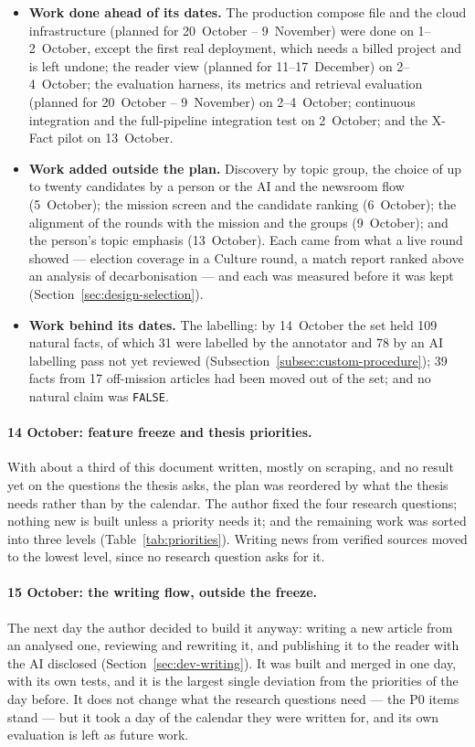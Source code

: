\begin{itemize}
    \item \textbf{Work done ahead of its dates.} The production compose
    file and the cloud infrastructure (planned for 20~October --
    9~November) were done on 1--2~October, except the first real
    deployment, which needs a billed project and is left undone; the
    reader view (planned for 11--17~December) on 2--4~October; the
    evaluation harness, its metrics and retrieval evaluation (planned
    for 20~October -- 9~November) on 2--4~October; continuous
    integration and the full-pipeline integration test on 2~October;
    and the X-Fact pilot on 13~October.
    \item \textbf{Work added outside the plan.} Discovery by topic
    group, the choice of up to twenty candidates by a person or the AI
    and the newsroom flow (5~October); the mission screen and the
    candidate ranking (6~October); the alignment of the rounds with the
    mission and the groups (9~October); and the person's topic emphasis
    (13~October). Each came from what a live round showed --- election
    coverage in a Culture round, a match report ranked above an
    analysis of decarbonisation --- and each was measured before it was
    kept (Section~\ref{sec:design-selection}).
    \item \textbf{Work behind its dates.} The labelling: by
    14~October the set held 109 natural facts, of which 31 were
    labelled by the annotator and 78 by an AI labelling pass not yet
    reviewed (Subsection~\ref{subsec:custom-procedure}); 39 facts from
    17 off-mission articles had been moved out of the set; and no
    natural claim was \texttt{FALSE}.
\end{itemize}

\paragraph{14 October: feature freeze and thesis priorities.} With
about a third of this document written, mostly on scraping, and no
result yet on the questions the thesis asks, the plan was reordered by
what the thesis needs rather than by the calendar. The author fixed the
four research questions; nothing new is built unless a priority needs
it; and the remaining work was sorted into three levels
(Table~\ref{tab:priorities}). Writing news from verified sources moved
to the lowest level, since no research question asks for it.

\paragraph{15 October: the writing flow, outside the freeze.} The next
day the author decided to build it anyway: writing a new article from
an analysed one, reviewing and rewriting it, and publishing it to the
reader with the AI disclosed (Section~\ref{sec:dev-writing}). It was
built and merged in one day, with its own tests, and it is the largest
single deviation from the priorities of the day before. It does not
change what the research questions need --- the P0 items stand --- but
it took a day of the calendar they were written for, and its own
evaluation is left as future work.

